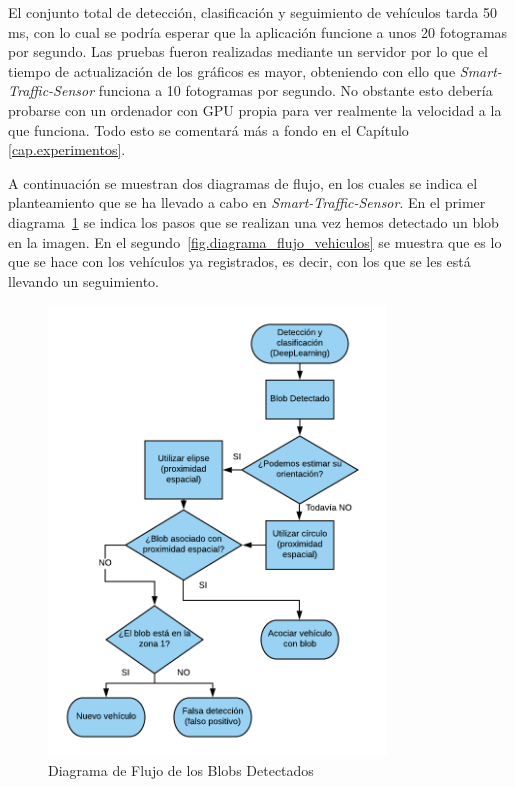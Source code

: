 El conjunto total de detección, clasificación y seguimiento de vehículos tarda 50 ms, con lo cual se podría esperar que la aplicación funcione a unos 20 fotogramas por segundo. Las pruebas fueron realizadas mediante un servidor por lo que el tiempo de actualización de los gráficos es mayor, obteniendo con ello que \textit{Smart-Traffic-Sensor} funciona a 10 fotogramas por segundo. No obstante esto debería probarse con un ordenador con GPU propia para ver realmente la velocidad a la que funciona. Todo esto se comentará más a fondo en el Capítulo \ref{cap.experimentos}.

A continuación se muestran dos diagramas de flujo, en los cuales se indica el planteamiento que se ha llevado a cabo en \textit{Smart-Traffic-Sensor}. En el primer diagrama~\ref{fig.diagrama_flujo_blob} se indica los pasos que se realizan una vez hemos detectado un blob en la imagen. En el segundo~\ref{fig.diagrama_flujo_vehiculos} se muestra que es lo que se hace con los vehículos ya registrados, es decir, con los que se les está llevando un seguimiento.

\begin{figure}[H] 
\begin{center}
	\includegraphics[width=0.8\textwidth]{figures/Diseno_global/diagrama_flujo.png}
   \caption{Diagrama de Flujo de  los Blobs Detectados}
	\label{fig.diagrama_flujo_blob}
\end{center}
\end{figure}

